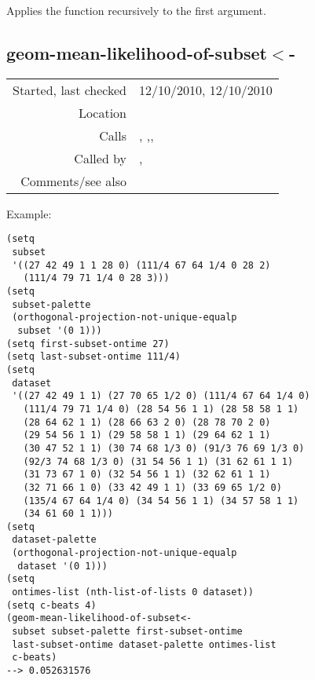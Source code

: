 \noindent Applies the function
recursively to the first argument.


\subsection*{geom-mean-likelihood-of-subset$<$-}\label{fun:geom-mean-likelihood-of-subset<-}

\vspace{0.3cm}
\begin{tabular}{r|p{8cm}}
Started, last checked & 12/10/2010, 12/10/2010 \\
Location & \nameref{sec:generating-beat-MNN-spacing-backwards} \\
Calls & \nameref{fun:empirical-mass}, \nameref{fun:index-1st-sublist-item>=},\newline \nameref{fun:index-1st-sublist-item>}, \nameref{fun:likelihood-of-subset} \\
Called by & \nameref{fun:comparable-likelihood-profilep},\newline \nameref{fun:geom-mean-likelihood-of-states} \\
Comments/see also & 
\end{tabular}

\vspace{0.5cm}
\noindent Example:
\begin{verbatim}
(setq
 subset
 '((27 42 49 1 1 28 0) (111/4 67 64 1/4 0 28 2)
   (111/4 79 71 1/4 0 28 3)))
(setq
 subset-palette
 (orthogonal-projection-not-unique-equalp
  subset '(0 1)))
(setq first-subset-ontime 27)
(setq last-subset-ontime 111/4)
(setq
 dataset
 '((27 42 49 1 1) (27 70 65 1/2 0) (111/4 67 64 1/4 0)
   (111/4 79 71 1/4 0) (28 54 56 1 1) (28 58 58 1 1)
   (28 64 62 1 1) (28 66 63 2 0) (28 78 70 2 0)
   (29 54 56 1 1) (29 58 58 1 1) (29 64 62 1 1)
   (30 47 52 1 1) (30 74 68 1/3 0) (91/3 76 69 1/3 0)
   (92/3 74 68 1/3 0) (31 54 56 1 1) (31 62 61 1 1)
   (31 73 67 1 0) (32 54 56 1 1) (32 62 61 1 1)
   (32 71 66 1 0) (33 42 49 1 1) (33 69 65 1/2 0)
   (135/4 67 64 1/4 0) (34 54 56 1 1) (34 57 58 1 1)
   (34 61 60 1 1)))
(setq
 dataset-palette
 (orthogonal-projection-not-unique-equalp
  dataset '(0 1)))
(setq
 ontimes-list (nth-list-of-lists 0 dataset))
(setq c-beats 4)
(geom-mean-likelihood-of-subset<-
 subset subset-palette first-subset-ontime
 last-subset-ontime dataset-palette ontimes-list
 c-beats)
--> 0.052631576
\end{verbatim}

